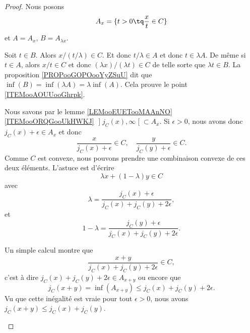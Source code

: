 \begin{proof}
	Nous posons
	\begin{equation}
		A_x=\{ t>0\tq \frac{ x }{ t }\in C \}
	\end{equation}
	et \( A=A_x\), \( B=A_{\lambda x}\).
	\begin{subproof}
		\spitem[\( B=\lambda A\)]
		Soit \( t\in B\). Alors \( x/(t/\lambda)\in C\). Et donc \( t/\lambda\in A\) et donc \( t\in \lambda A\). De même si \( t\in A\), alors \( x/t\in C\) et donc \( (\lambda x)/(\lambda t)\in C\) de telle sorte que \( \lambda t\in B\).
		La proposition \ref{PROPooGOPOooYyZSuU} dit que \( \inf(B)=\inf(\lambda A)=\lambda\inf(A)\). Cela prouve le point \ref{ITEMooAOUUooGhrpk}.


		Nous savons par le lemme \ref{LEMooEUETooMAAnNO}\ref{ITEMooORQGooUkHWKJ} \( \mathopen] j_C(x),\infty\mathclose[\subset A_x\). Si \( \epsilon>0\), nous avons donc \( j_C(x)+\epsilon\in A_x\) et donc
		\begin{equation}
			\frac{ x }{ j_C(x)+\epsilon }\in C,\quad \frac{ y }{ j_C(y)+\epsilon }\in C.
		\end{equation}
		Comme \( C\) est convexe, nous pouvons prendre une combinaison convexe de ces deux éléments. L'astuce est d'écrire
		\begin{equation}
			\lambda x+(1-\lambda)y\in C
		\end{equation}
		avec
		\begin{equation}
			\lambda=\frac{ j_C(x)+\epsilon }{ j_C(x)+j_C(y)+2\epsilon },
		\end{equation}
		et
		\begin{equation}
			1-\lambda=\frac{ j_C(y)+\epsilon }{ j_C(x)+j_C(y)+2\epsilon }.
		\end{equation}

		Un simple calcul montre que
		\begin{equation}
			\frac{ x+y }{ j_C(x)+j_C(y)+2\epsilon }\in C,
		\end{equation}
		c'est à dire \( j_C(x)+j_C(y)+2\epsilon\in A_{x+y}\) ou encore que
		\begin{equation}
			j_C(x+y)=\inf(A_{x+y})\leq j_C(x)+j_C(y)+2\epsilon.
		\end{equation}
		Vu que cette inégalité est vraie pour tout \( \epsilon>0\), nous avons \( j_C(x+y)\leq j_C(x)+j_C(y)\).


\end{subproof}
\end{proof}
